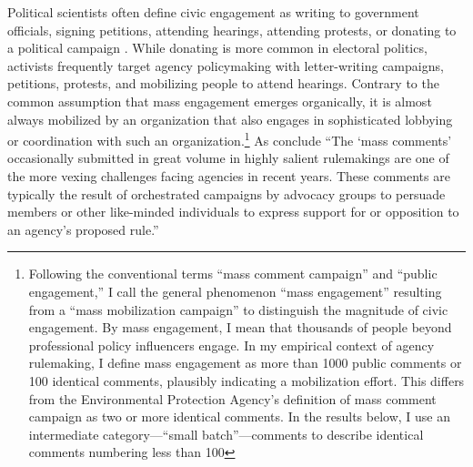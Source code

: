 Political scientists often define civic engagement as writing to government officials, signing petitions, attending hearings, attending protests, or donating to a political campaign \citep{Verba1987}. While donating is more common in electoral politics, activists frequently target agency policymaking with letter-writing campaigns, petitions, protests, and mobilizing people to attend hearings. 
Contrary to the common assumption that mass engagement emerges organically, it is almost always mobilized by an organization that also engages in sophisticated lobbying or coordination with such an organization.\footnote{Following the conventional terms ``mass comment campaign'' and ``public engagement,'' I call the general phenomenon ``mass engagement'' resulting from a ``mass mobilization campaign'' to distinguish the magnitude of civic engagement. By mass engagement, I mean that thousands of people beyond professional policy influencers engage. In my empirical context of agency rulemaking, I define mass engagement as more than 1000 public comments or 100 identical comments, plausibly indicating a mobilization effort. This differs from the Environmental Protection Agency's definition of mass comment campaign as two or more identical comments. In the results below, I use an intermediate category---``small batch''---comments to describe identical comments numbering less than 100}  %
As \citet{SantAmbrogio2018} conclude ``The `mass comments' occasionally submitted in great volume in highly salient rulemakings are one of the more vexing challenges facing agencies in recent years. These comments are typically the result of orchestrated campaigns by advocacy groups to persuade members or other like-minded individuals to express support for or opposition to an agency's proposed rule.'' %

